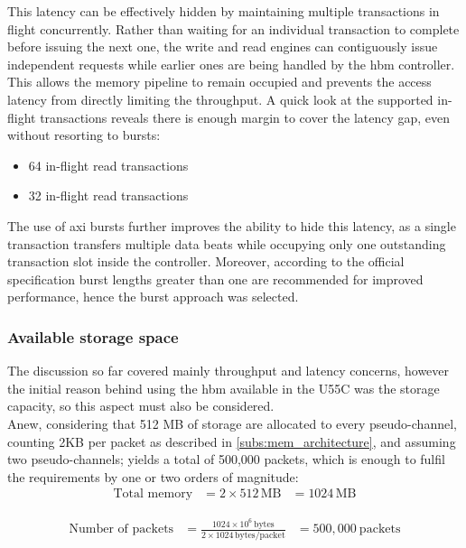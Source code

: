 This latency can be effectively hidden by maintaining multiple transactions in flight concurrently.
Rather than waiting for an individual transaction to complete before issuing the next one, the write and read engines can contiguously issue
independent requests while earlier ones are being handled by the \gls{hbm} controller. This allows the memory pipeline to remain
occupied and prevents the access latency from directly limiting the throughput. A quick look at the supported in-flight transactions
reveals there is enough margin to cover the latency gap, even without resorting to bursts:

\begin{itemize}
  \item 64 in-flight read transactions
  \item 32 in-flight read transactions
\end{itemize}

The use of \gls{axi} bursts further improves the ability to hide this latency, as a single transaction transfers multiple data beats
while occupying only one outstanding transaction slot inside the controller. Moreover, according to the official specification
\cite{amd_pg276_axi_hbm} burst lengths greater than one are recommended for improved performance, hence the burst approach was
selected.

\subsubsection{Available storage space}
The discussion so far covered mainly throughput and latency concerns, however the initial reason behind using the \gls{hbm} 
available in the U55C was the storage capacity, so this aspect must also be considered.\\

Anew, considering that 512 MB of storage are allocated to every pseudo-channel, counting 2KB per packet as described 
in \ref{subs:mem_architecture}, and assuming two pseudo-channels; 
yields a total of 500,000 packets, which is enough to fulfil the requirements by one or two orders of magnitude: \\

\[
\begin{aligned}
\text{Total memory}
&= 2 \times 512\,\mathrm{MB} 
&= 1024\,\mathrm{MB}
\end{aligned}
\]

\[
\begin{aligned}
\text{Number of packets}
&= \frac{1024\times10^6\,\mathrm{bytes}}
        {2\times1024\,\mathrm{bytes/packet}}
&= \boxed{500{,}000\ \mathrm{packets}}
\end{aligned}
\]

